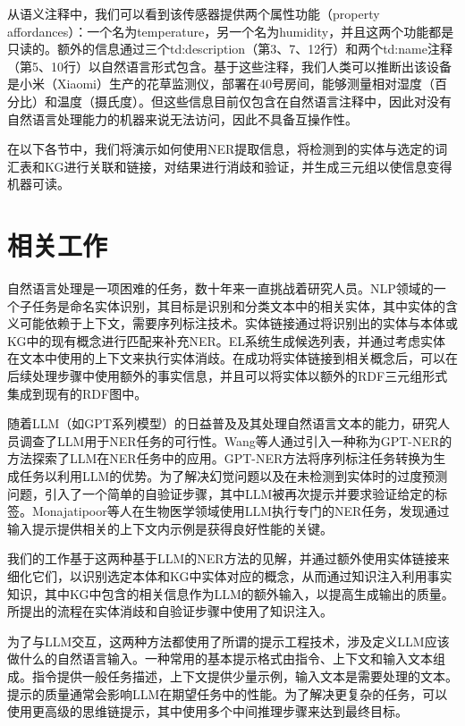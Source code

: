 \documentclass[supercite]{Experimental_Report}
\theoremstyle{definition}
\begin{document}
从语义注释中，我们可以看到该传感器提供两个属性功能（property affordances）：一个名为temperature，另一个名为humidity，并且这两个功能都是只读的。额外的信息通过三个td:description（第3、7、12行）和两个td:name注释（第5、10行）以自然语言形式包含。基于这些注释，我们人类可以推断出该设备是小米（Xiaomi）生产的花草监测仪，部署在40号房间，能够测量相对湿度（百分比）和温度（摄氏度）。但这些信息目前仅包含在自然语言注释中，因此对没有自然语言处理能力的机器来说无法访问，因此不具备互操作性。

在以下各节中，我们将演示如何使用NER提取信息，将检测到的实体与选定的词汇表和KG进行关联和链接，对结果进行消歧和验证，并生成三元组以使信息变得机器可读。

\section{相关工作}

自然语言处理是一项困难的任务，数十年来一直挑战着研究人员\cite{ref12}。NLP领域的一个子任务是命名实体识别，其目标是识别和分类文本中的相关实体，其中实体的含义可能依赖于上下文，需要序列标注技术\cite{ref13}。实体链接通过将识别出的实体与本体或KG中的现有概念进行匹配来补充NER。EL系统生成候选列表，并通过考虑实体在文本中使用的上下文来执行实体消歧。在成功将实体链接到相关概念后，可以在后续处理步骤中使用额外的事实信息\cite{ref20}，并且可以将实体以额外的RDF三元组形式集成到现有的RDF图中。

随着LLM（如GPT系列模型\cite{ref6}）的日益普及及其处理自然语言文本的能力\cite{ref26}，研究人员调查了LLM用于NER任务的可行性。Wang等人\cite{ref23}通过引入一种称为GPT-NER的方法探索了LLM在NER任务中的应用。GPT-NER方法将序列标注任务转换为生成任务以利用LLM的优势。为了解决幻觉问题以及在未检测到实体时的过度预测问题，引入了一个简单的自验证步骤，其中LLM被再次提示并要求验证给定的标签。Monajatipoor等人\cite{ref11}在生物医学领域使用LLM执行专门的NER任务，发现通过输入提示提供相关的上下文内示例是获得良好性能的关键。

我们的工作基于这两种基于LLM的NER方法的见解，并通过额外使用实体链接来细化它们，以识别选定本体和KG中实体对应的概念，从而通过知识注入\cite{ref7}利用事实知识，其中KG中包含的相关信息作为LLM的额外输入，以提高生成输出的质量。所提出的流程在实体消歧和自验证步骤中使用了知识注入。

为了与LLM交互，这两种方法都使用了所谓的提示工程技术，涉及定义LLM应该做什么的自然语言输入。一种常用的基本提示格式由指令、上下文和输入文本组成。指令提供一般任务描述，上下文提供少量示例，输入文本是需要处理的文本\cite{ref15}。提示的质量通常会影响LLM在期望任务中的性能\cite{ref22}。为了解决更复杂的任务，可以使用更高级的思维链提示\cite{ref24}，其中使用多个中间推理步骤来达到最终目标。
\end{document}
